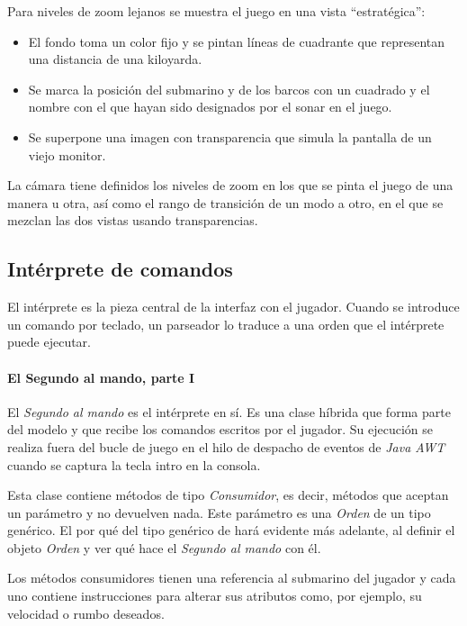 \documentclass[a4paper,
	11pt,
	parskip=full,
	bibliography=totoc,
	twoside
	]{scrartcl}
\begin{document}
			Para niveles de zoom lejanos se muestra el juego en una vista ``estratégica'':
			
			\begin{itemize}[noitemsep]
				\item El fondo toma un color fijo y se pintan líneas de cuadrante que representan una distancia de una kiloyarda.
				\item Se marca la posición del submarino y de los barcos con un cuadrado y el nombre con el que hayan sido designados por el sonar en el juego.
				\item Se superpone una imagen con transparencia que simula la pantalla de un viejo monitor.
			\end{itemize}
		
			La cámara tiene definidos los niveles de zoom en los que se pinta el juego de una manera u otra, así como el rango de transición de un modo a otro, en el que se mezclan las dos vistas usando transparencias.
	
	\subsection{Intérprete de comandos}
	\label{subsec:interprete_comandos}
		El intérprete es la pieza central de la interfaz con el jugador. Cuando se introduce un comando por teclado, un parseador lo traduce a una orden que el intérprete puede ejecutar. \cite{codementor_method_reference, freecode_lambda, baeldung_lambda, so_runnable}
		
		\paragraph{El Segundo al mando, parte I}
			El \textit{Segundo al mando} es el intérprete en sí. Es una clase híbrida que forma parte del modelo y que recibe los comandos escritos por el jugador. Su ejecución se realiza fuera del bucle de juego en el hilo de despacho de eventos de \textit{Java AWT} \cite{java_dispatch, baeldung_concurrent} cuando se captura la tecla intro en la consola.
			
			Esta clase contiene métodos de tipo \textit{Consumidor}, es decir, métodos que aceptan un parámetro y no devuelven nada. Este parámetro es una \textit{Orden} de un tipo genérico. El por qué del tipo genérico de hará evidente más adelante, al definir el objeto \textit{Orden} y ver qué hace el \textit{Segundo al mando} con él.
			
			Los métodos consumidores tienen una referencia al submarino del jugador y cada uno contiene instrucciones para alterar sus atributos como, por ejemplo, su velocidad o rumbo deseados.
			
\end{document}
